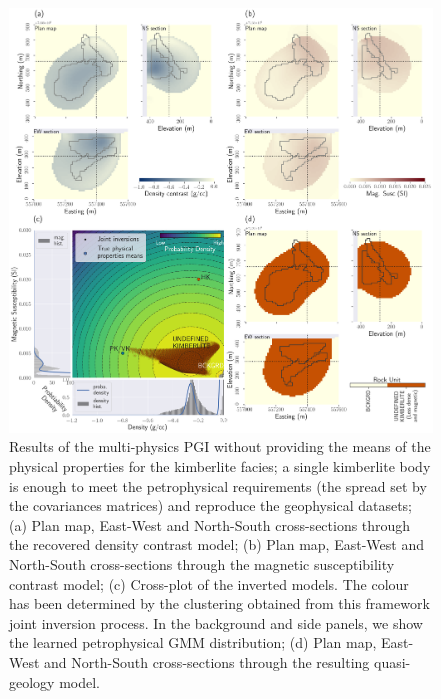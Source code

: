 \begin{figure}
    \centering
    \includegraphics[width=\textwidth]{Fig/LowRes/TKC_NoPrior_Synthetic.png}
    \caption{Results of the multi-physics PGI without providing the means of the physical properties for the kimberlite facies; a single kimberlite body is enough to meet the petrophysical requirements (the spread set by the covariances matrices) and reproduce the geophysical datasets; (a) Plan map, East-West and North-South cross-sections through the recovered density contrast model; (b) Plan map, East-West and North-South cross-sections through the magnetic susceptibility contrast model; (c) Cross-plot of the inverted models. The colour has been determined by the clustering obtained from this framework joint inversion process. In the background and side panels, we show the learned petrophysical GMM distribution; (d) Plan map, East-West and North-South cross-sections through the resulting quasi-geology model.}
    \label{fig:TKC_NoPrior_Synthetic.png}
\end{figure}
